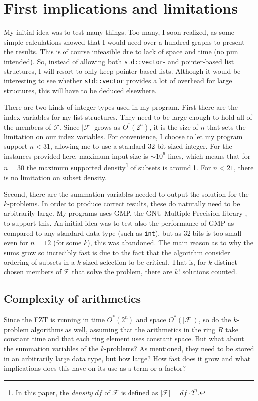 \documentclass[a4paper, titlepage]{article}
\newcommand{\code}{\texttt}
\begin{document}
\section{First implications and limitations}
My initial idea was to test many things. Too many, I soon realized, as some simple calculations showed that I would need over a hundred graphs to present the results. This is of course infeasible due to lack of space and time (no pun intended). So, instead of allowing both \code{std::vector}- and pointer-based list structures, I will resort to only keep pointer-based lists. Although it would be interesting to see whether \code{std::vector} provides a lot of overhead for large structures, this will have to be deduced elsewhere.

There are two kinds of integer types used in my program. First there are the index variables for my list structures. They need to be large enough to hold all of the members of $\mathcal{F}$. Since $|\mathcal{F}|$ grows as $O^*(2^n)$, it is the size of $n$ that sets the limitation on our index variables. For convenience, I choose to let my program support $n < 31$, allowing me to use a standard 32-bit sized integer. For the instances provided here, maximum input size is $\sim 10^6$ lines, which means that for $n=30$ the maximum supported density\footnote{In this paper, the \emph{density} $df$ of $\mathcal{F}$ is defined as $|\mathcal{F}| = df\cdot2^n$.} of subsets is around 1\permil. For $n<21$, there is no limitation on subset density.

Second, there are the summation variables needed to output the solution for the $k$-problems. In order to produce correct results, these do naturally need to be arbitrarily large. My programs uses GMP, the GNU Multiple Precision library \cite{gmp}, to support this. An initial idea was to test also the performance of GMP as compared to any standard data type (such as \code{int}), but as 32 bits is too small even for $n=12$ (for some $k$), this was abandoned. The main reason as to why the sums grow so incredibly fast is due to the fact that the algorithm consider ordering of subsets in a $k$-sized selection to be critical. That is, for $k$ distinct chosen members of $\mathcal{F}$ that solve the problem, there are $k!$ solutions counted.

\subsection{Complexity of arithmetics}
Since the FZT is running in time $O^*(2^n)$ and space $O^*(|\mathcal{F}|)$, so do the $k$-problem algorithms as well, assuming that the arithmetics in the ring $R$ take constant time and that each ring element uses constant space. But what about the summation variables of the $k$-problems? As mentioned, they need to be stored in an arbitrarily large data type, but how large? How fast does it grow and what implications does this have on its use as a term or a factor?
\end{document}
